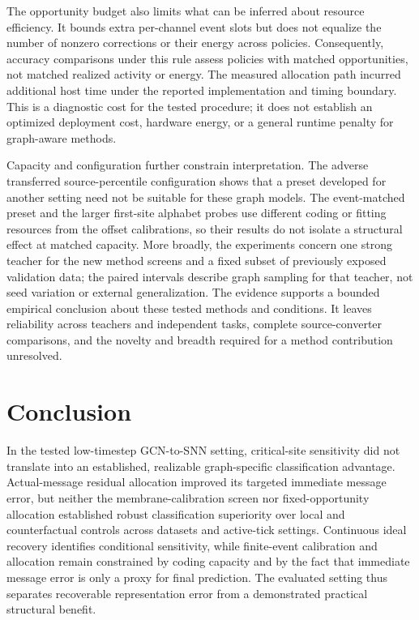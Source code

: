 \documentclass[11pt]{article}
\begin{document}
The opportunity budget also limits what can be inferred about resource efficiency. It bounds extra per-channel event slots but does not equalize the number of nonzero corrections or their energy across policies. Consequently, accuracy comparisons under this rule assess policies with matched opportunities, not matched realized activity or energy. The measured allocation path incurred additional host time under the reported implementation and timing boundary. This is a diagnostic cost for the tested procedure; it does not establish an optimized deployment cost, hardware energy, or a general runtime penalty for graph-aware methods.

Capacity and configuration further constrain interpretation. The adverse transferred source-percentile configuration shows that a preset developed for another setting need not be suitable for these graph models. The event-matched preset and the larger first-site alphabet probes use different coding or fitting resources from the offset calibrations, so their results do not isolate a structural effect at matched capacity. More broadly, the experiments concern one strong teacher for the new method screens and a fixed subset of previously exposed validation data; the paired intervals describe graph sampling for that teacher, not seed variation or external generalization. The evidence supports a bounded empirical conclusion about these tested methods and conditions. It leaves reliability across teachers and independent tasks, complete source-converter comparisons, and the novelty and breadth required for a method contribution unresolved.

\section{Conclusion}

In the tested low-timestep GCN-to-SNN setting, critical-site sensitivity did not translate into an established, realizable graph-specific classification advantage. Actual-message residual allocation improved its targeted immediate message error, but neither the membrane-calibration screen nor fixed-opportunity allocation established robust classification superiority over local and counterfactual controls across datasets and active-tick settings. Continuous ideal recovery identifies conditional sensitivity, while finite-event calibration and allocation remain constrained by coding capacity and by the fact that immediate message error is only a proxy for final prediction. The evaluated setting thus separates recoverable representation error from a demonstrated practical structural benefit.



\end{document}
